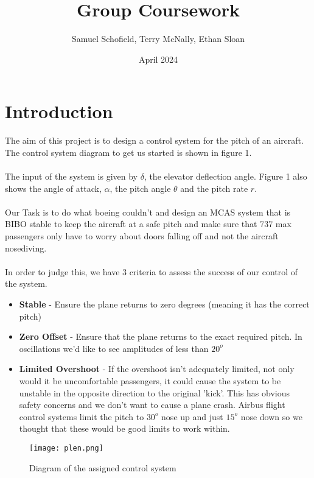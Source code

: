 \documentclass{article}
\title{Group Coursework}
\author{Samuel Schofield, Terry McNally, Ethan Sloan}
\date{April 2024}
\numberwithin{equation}{section}
\begin{document}
\maketitle

\section{Introduction}
The aim of this project is to design a control system for the pitch of an aircraft. The control system diagram to get us started is shown in figure 1.\\\\
The input of the system is given by \(\delta\), the elevator deflection angle. Figure 1 also shows the angle of attack, \(\alpha\), the pitch angle \(\theta\) and the pitch rate \(r\).\\\\
Our Task is to do what boeing couldn't and design an MCAS system that is BIBO stable to keep the aircraft at a safe pitch and make sure that 737 max passengers only have to worry about doors falling off and not the aircraft nosediving.\\\\
In order to judge this, we have 3 criteria to assess the success of our control of the system.
\begin{itemize}
    \item \textbf{Stable} - Ensure the plane returns to zero degrees (meaning it has the correct pitch)
    \item \textbf{Zero Offset} - Ensure that the plane returns to the exact required pitch. In oscillations we'd like to see amplitudes of less than \(20^o\)
    \item \textbf{Limited Overshoot} - If the overshoot isn't adequately limited, not only would it be uncomfortable passengers, it could cause the system to be unstable in the opposite direction to the original 'kick'. This has obvious safety concerns and we don't want to cause a plane crash. Airbus flight control systems limit the pitch to \(30^o\) nose up and just \(15^o\) nose down so we thought that these would be good limits to work within.
\end{itemize}



\begin{figure}
    \centering
    \texttt{[image: plen.png]}
    \caption{Diagram of the assigned control system}
    \label{fig:Figure 1}
\end{figure}
\newpage
\end{document}
